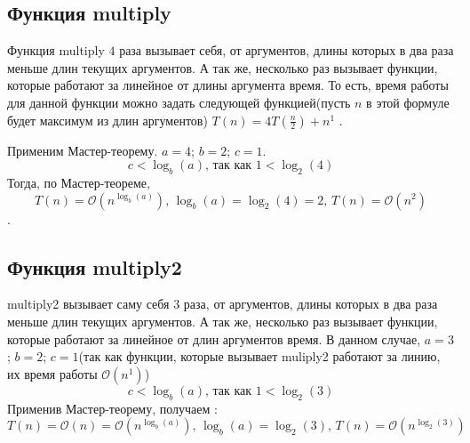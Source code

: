 \documentclass{article}
\begin{document}
\subsection{Функция multiply}
Функция multiply $4$ раза вызывает себя, от аргументов, длины которых в два раза меньше длин текущих аргументов. А так же, несколько раз вызывает функции, которые работают за линейное от длины аргумента время. То есть, время работы для данной функции можно задать следующей функцией(пусть $n$ в этой формуле будет максимум из длин аргументов) $T(n) = 4T(\frac{n}{2}) + n^{1}$ .

Применим Мастер-теорему. $a = 4$; $b = 2$; $c = 1$. 
$$c < \log_{b}(a) \mbox{, так как } 1 < \log_{2}(4)$$
Тогда, по Мастер-теореме, $$T(n) = \mathcal{O}(n^{\log_{b}(a)}) \mbox{, } \log_{b}(a) = \log_{2}(4) = 2 \mbox{, } T(n) = \mathcal{O}(n^{2})$$.
\subsection{Функция multiply2}
multiply2 вызывает саму себя $3$ раза, от аргументов, длины которых в два раза меньше длин текущих аргументов. А так же, несколько раз вызывает функции, которые работают за линейное от длин аргументов время. 
В данном случае, $a = 3$; $b = 2$; $c = 1$(так как функции, которые вызывает muliply2 работают за линию, их время работы $\mathcal{O}(n^{1})$)
$$c < \log_{b}(a) \mbox{, так как } 1 < \log_{2}(3)$$
Применив Мастер-теорему, получаем : 
$$T(n) = \mathcal{O}(n) = \mathcal{O}(n^{\log_{b}(a)}) \mbox{, } \log_{b}(a) = \log_{2}(3) \mbox{, } T(n) = \mathcal{O}(n^{\log_{2}(3)})$$
\end{document}
